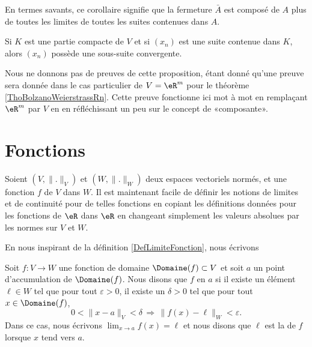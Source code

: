 En termes savants, ce corollaire signifie que la fermeture $\bar A$ est composé de $A$ plus de toutes les limites de toutes les suites contenues dans $A$.


\begin{proposition}		\label{PropSuiteCompactSScv}
	Si $K$ est une partie compacte de $V$ et si $(x_n)$ est une suite contenue dans $K$, alors $(x_n)$ possède une sous-suite convergente.
\end{proposition}

Nous ne donnons pas de preuves de cette proposition, étant donné qu'une preuve sera donnée dans le cas particulier de $V=\eR^m$ pour le théorème \ref{ThoBolzanoWeierstrassRn}. Cette preuve fonctionne ici mot à mot en remplaçant $\eR^m$ par $V$ en en réfléchissant un peu sur le concept de «composante».

\section{Fonctions}		\label{Sect_fonctions}

Soient $(V,\| . \|_V)$ et $(W,\| . \|_W)$ deux espaces vectoriels normés, et une fonction $f$ de $V$ dans $W$. Il est maintenant facile de définir les notions de limites et de continuité pour de telles fonctions en copiant les définitions données pour les fonctions de $\eR$ dans $\eR$ en changeant simplement les valeurs absolues par les normes sur $V$ et $W$.

En nous inspirant de la définition \ref{DefLimiteFonction}, nous écrivons
\begin{definition}		\label{LimiteDansEVN}
	Soit $f\colon V\to W$ une fonction de domaine \( \Domaine(f)\subset V\) et soit $a$ un point d'accumulation de $\Domaine(f)$. Nous disons que $f$  en $a$ si il existe un élément $\ell\in W$ tel que pour tout $\varepsilon>0$, il existe un $\delta>0$ tel que pour tout $x\in \Domaine(f)$,
    \begin{equation}        \label{EqDefLimzxmasubV}
		0<\| x-a \|_V<\delta\,\Rightarrow\,\| f(x)-\ell \|_W<\varepsilon.
	\end{equation}
	Dans ce cas, nous écrivons $\lim_{x\to a} f(x)=\ell$ et nous disons que $\ell$ est la  de $f$ lorsque $x$ tend vers $a$.
\end{definition}

